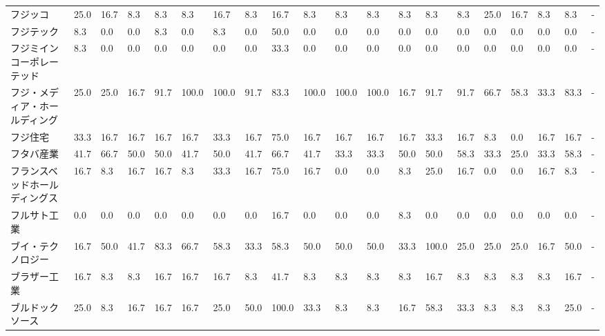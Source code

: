 \documentclass[a4paper，11pt]{jsarticle}
\begin{document}
\begin{longtable}[c]{lp{3mm}p{3mm}p{3mm}p{3mm}p{3mm}p{3mm}p{3mm}p{3mm}p{3mm}p{3mm}p{3mm}p{3mm}p{3mm}p{3mm}p{3mm}p{3mm}p{3mm}p{3mm}p{3mm}}
フジッコ            &   25.0 &   16.7 &       8.3 &       8.3 &        8.3 &   16.7 &    8.3 &   16.7 &     8.3 &     8.3 &    8.3 &   8.3 &    8.3 &     8.3 &    25.0 &  16.7 &   8.3 &   8.3 &     - \\
フジテック           &    8.3 &    0.0 &       0.0 &       8.3 &        0.0 &    8.3 &    0.0 &   50.0 &     0.0 &     0.0 &    0.0 &   0.0 &    0.0 &     0.0 &     0.0 &   0.0 &   0.0 &   0.0 &     - \\
フジミインコーポレーテッド   &    8.3 &    0.0 &       0.0 &       0.0 &        0.0 &    0.0 &    0.0 &   33.3 &     0.0 &     0.0 &    0.0 &   0.0 &    0.0 &     0.0 &     0.0 &   0.0 &   0.0 &   0.0 &     - \\
フジ・メディア・ホールディング &   25.0 &   25.0 &      16.7 &      91.7 &      100.0 &  100.0 &   91.7 &   83.3 &   100.0 &   100.0 &  100.0 &  16.7 &   91.7 &    91.7 &    66.7 &  58.3 &  33.3 &  83.3 &     - \\
フジ住宅            &   33.3 &   16.7 &      16.7 &      16.7 &       16.7 &   33.3 &   16.7 &   75.0 &    16.7 &    16.7 &   16.7 &  16.7 &   33.3 &    16.7 &     8.3 &   0.0 &  16.7 &  16.7 &     - \\
フタバ産業           &   41.7 &   66.7 &      50.0 &      50.0 &       41.7 &   50.0 &   41.7 &   66.7 &    41.7 &    33.3 &   33.3 &  50.0 &   50.0 &    58.3 &    33.3 &  25.0 &  33.3 &  58.3 &     - \\
フランスベッドホールディングス &   16.7 &    8.3 &      16.7 &      16.7 &        8.3 &   33.3 &   16.7 &   75.0 &    16.7 &     0.0 &    0.0 &   8.3 &   25.0 &    16.7 &     0.0 &   0.0 &  16.7 &   8.3 &     - \\
フルサト工業          &    0.0 &    0.0 &       0.0 &       0.0 &        0.0 &    0.0 &    0.0 &   16.7 &     0.0 &     0.0 &    0.0 &   8.3 &    0.0 &     0.0 &     0.0 &   0.0 &   0.0 &   0.0 &     - \\
ブイ・テクノロジー       &   16.7 &   50.0 &      41.7 &      83.3 &       66.7 &   58.3 &   33.3 &   58.3 &    50.0 &    50.0 &   50.0 &  33.3 &  100.0 &    25.0 &    25.0 &  25.0 &  16.7 &  50.0 &     - \\
ブラザー工業          &   16.7 &    8.3 &       8.3 &      16.7 &       16.7 &   16.7 &    8.3 &   41.7 &     8.3 &     8.3 &    8.3 &   8.3 &   16.7 &     8.3 &     8.3 &   8.3 &   8.3 &  16.7 &     - \\
ブルドックソース        &   25.0 &    8.3 &      16.7 &      16.7 &       16.7 &   25.0 &   50.0 &  100.0 &    33.3 &     8.3 &    8.3 &  16.7 &   58.3 &    33.3 &     8.3 &   8.3 &   8.3 &  25.0 &     - \\

\end{longtable}
\end{document}
